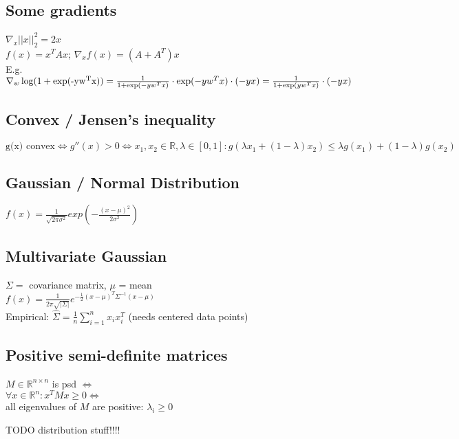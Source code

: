 \documentclass[11pt]{article}
\begin{document}
\begin{multicols*}{3}
\subsection*{Some gradients}
$\nabla_x ||x||_2^2 = 2 x$\\
$f(x) = x^T A x$; $\nabla_x f(x) = (A + A^T) x$\\
E.g. $\nabla_w \operatorname{log}(1+\operatorname{exp(-y w^T x)}) = \\
\frac{1}{1+\operatorname{exp}(-y w^T x)} \cdot \operatorname{exp}(-y w^T x) \cdot (-y x) = \\
\frac{1}{1 + \operatorname{exp}(y w^T x)} \cdot(-yx)$\\


\subsection*{Convex / Jensen's inequality}
$\text{g(x) convex} \Leftrightarrow g''(x) > 0 \Leftrightarrow x_1,x_2 \in \mathbb{R}, \lambda \in [0,1]: 
g(\lambda x_1 + (1-\lambda) x_2) \leq \lambda g(x_1) + (1-\lambda) g(x_2)$

\subsection*{Gaussian / Normal Distribution}
$f(x) = \frac{1}{\sqrt{2\pi\sigma^2}} exp(-\frac{(x-\mu)^2}{2\sigma^2})$

\subsection*{Multivariate Gaussian}
$\Sigma =$ covariance matrix, $\mu$ = mean\\
$f(x) = \frac{1}{2\pi \sqrt{|\Sigma|}} e^{- \frac{1}{2} (x-\mu)^T \Sigma^{-1} (x-\mu)}$\\
Empirical: $\hat{\Sigma} = \frac{1}{n}\sum_{i=1}^n x_i x_i^T$ (needs centered data points)

\subsection*{Positive semi-definite matrices}
$M \in \mathbb{R}^{n\times n}$ is psd $\Leftrightarrow$\\
$\forall x \in \mathbb{R}^n: x^TMx \geq 0 \Leftrightarrow$\\
all eigenvalues of $M$ are positive: $\lambda_i\geq 0$

TODO distribution stuff!!!!	
\end{multicols*}




	
\end{document}
